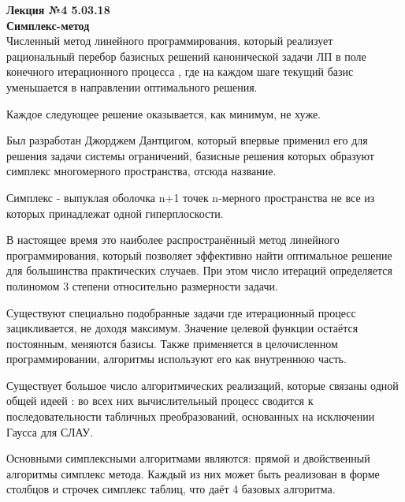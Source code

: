 

\LARGE{ \textbf {Лекция №4 5.03.18}}\\
\Large{ \textbf {Симплекс-метод}}\\

​
Численный метод линейного программирования, который реализует рациональный перебор базисных решений канонической задачи ЛП в поле конечного итерационного процесса , где на каждом шаге текущий базис уменьшается в направлении оптимального решения.

Каждое следующее решение оказывается, как минимум, не хуже.

Был разработан Джорджем Дантцигом, который впервые применил его для решения задачи системы ограничений, базисные решения которых образуют симплекс многомерного пространства, отсюда название.

Симплекс - выпуклая оболочка n+1 точек n-мерного пространства не все из которых принадлежат одной гиперплоскости.

В настоящее время это наиболее распространённый метод линейного программирования, который позволяет эффективно найти оптимальное решение для большинства практических случаев. При этом число итераций определяется полиномом 3 степени относительно размерности задачи.

Существуют специально подобранные задачи где итерационный процесс зацикливается, не доходя максимум. Значение целевой функции остаётся постоянным, меняются базисы.
Также применяется в целочисленном программировании, алгоритмы используют его как внутреннюю часть.

Существует большое число алгоритмических реализаций, которые связаны одной общей идеей : во всех них вычислительный процесс сводится к последовательности табличных преобразований, основанных на исключении Гаусса для СЛАУ.

Основными симплексными алгоритмами являются: прямой и двойственный алгоритмы симплекс метода. Каждый из них может быть реализован в форме столбцов и строчек симплекс таблиц, что даёт 4 базовых алгоритма.

